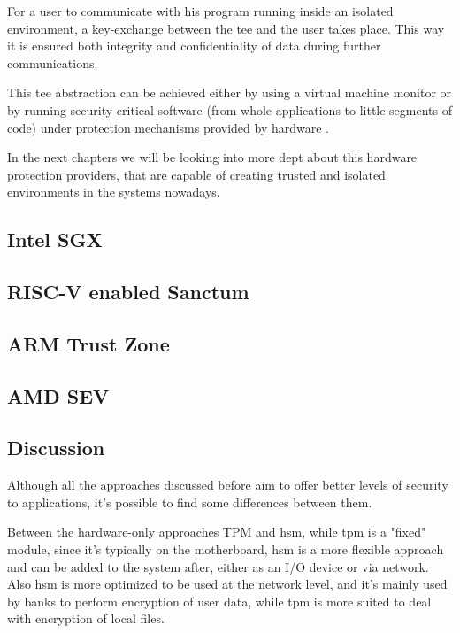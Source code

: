 For a user to communicate with his program running inside an isolated environment, a key-exchange between the \gls{tee} and the user takes place. This way it is ensured both integrity and confidentiality of data during further communications.

This \gls{tee} abstraction can be achieved either by using a virtual machine monitor or by running security critical software (from whole applications to little segments of code) under protection mechanisms provided by hardware \cite{pcopThesis}. 

In the next chapters we will be looking into more dept about this hardware protection providers, that are capable of creating trusted and isolated environments in the systems nowadays.

\subsection{Intel SGX}





\subsection{RISC-V enabled Sanctum}




\subsection{ARM Trust Zone}





\subsection{AMD SEV}




\subsection{Discussion}
\label{ssec:tee_discussion}

Although all the approaches discussed before aim to offer better levels of security to applications, it's possible to find some differences between them. 

Between the hardware-only approaches TPM and \gls{hsm}, while \gls{tpm} is a "fixed" module, since it's typically on the motherboard, \gls{hsm} is a more flexible approach and can be added to the system after, either as an I/O device or via network. Also \gls{hsm} is more optimized to be used at the network level, and it's mainly used by banks to perform encryption of user data, while \gls{tpm} is more suited to deal with encryption of local files.

